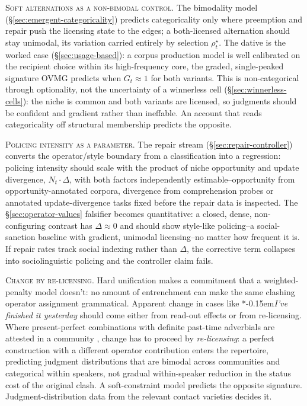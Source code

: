 \documentclass[12pt,letterpaper]{article}
\newcommand{\mention}[1]{\textit{#1}}
\newcommand{\judgesep}{\kern-0.15em}
\newcommand{\ungram}[1]{*\judgesep#1}
\begin{document}
\noindent\textsc{Soft alternations as a non-bimodal control.} The bimodality
model (\S\ref{sec:emergent-categoricality}) predicts categoricality only where
preemption and repair push the licensing state to the edges; a both-licensed
alternation should stay unimodal, its variation carried entirely by selection
$\rho_t^\star$. The dative is the worked case (\S\ref{sec:usage-based}): a corpus
production model is well calibrated on the recipient choice within its
high-frequency core, the graded, single-peaked signature OVMG predicts when
$G_t\approx1$ for both variants. This is non-categorical
through optionality, not the uncertainty of a winnerless cell
(\S\ref{sec:winnerless-cells}): the niche is common and both variants are
licensed, so judgments should be confident and gradient rather than ineffable.
An account that reads categoricality off structural membership predicts the
opposite.

\noindent\textsc{Policing intensity as a parameter.} The repair stream
(\S\ref{sec:repair-controller}) converts the operator/style boundary from a
classification into a regression: policing intensity should scale with the
product of niche opportunity and update divergence, $N_t\cdot\Delta$, with both
factors independently estimable--opportunity from opportunity-annotated
corpora, divergence from comprehension probes or annotated update-divergence
tasks fixed before the repair data is inspected. The \S\ref{sec:operator-values}
falsifier becomes quantitative: a closed, dense, non-configuring contrast has
$\Delta\approx0$ and should show style-like policing--a social-sanction baseline
with gradient, unimodal licensing--no matter how frequent it is. If repair rates
track social indexing rather than $\Delta$, the corrective term collapses into
sociolinguistic policing and the controller claim fails.

\noindent\textsc{Change by re-licensing.} Hard unification makes a commitment
that a weighted-penalty model doesn't: no amount of entrenchment can make the
same clashing operator assignment grammatical. Apparent change in cases like
\ungram{\mention{I've finished it yesterday}} should come either from
read-out effects or from re-licensing. Where present-perfect combinations with
definite past-time adverbials are attested in a community
\autocite{Werner2013DefiniteTemporalAdverbials,
Werner2013TemporalAdverbials}, change has to proceed by
\emph{re-licensing}: a perfect construction with a different operator
contribution enters the repertoire,
predicting judgment distributions that are bimodal across communities and
categorical within speakers, not gradual within-speaker reduction in the status
cost of the original clash. A
soft-constraint model predicts the opposite signature. Judgment-distribution
data from the relevant contact varieties decides it.
\end{document}
